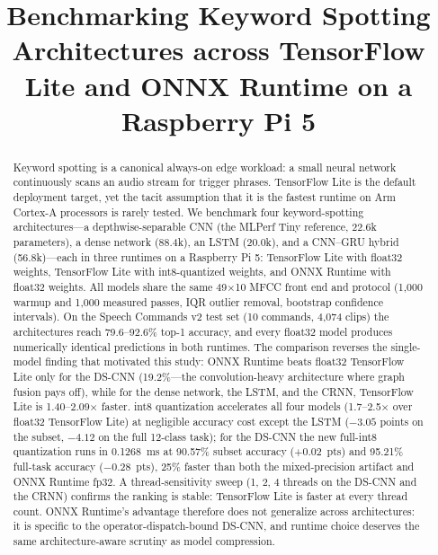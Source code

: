 \documentclass[conference,a4paper]{IEEEtran}
\begin{document}
\title{Benchmarking Keyword Spotting Architectures across TensorFlow Lite and ONNX Runtime on a Raspberry Pi 5}

\author{}

\maketitle

\begin{abstract}
Keyword spotting is a canonical always-on edge workload: a small neural network continuously scans an audio stream for trigger phrases. TensorFlow Lite is the default deployment target, yet the tacit assumption that it is the fastest runtime on Arm Cortex-A processors is rarely tested. We benchmark four keyword-spotting architectures---a depthwise-separable CNN (the MLPerf Tiny reference, 22.6k parameters), a dense network (88.4k), an LSTM (20.0k), and a CNN--GRU hybrid (56.8k)---each in three runtimes on a Raspberry Pi 5: TensorFlow Lite with float32 weights, TensorFlow Lite with int8-quantized weights, and ONNX Runtime with float32 weights. All models share the same 49$\times$10 MFCC front end and protocol (1{,}000 warmup and 1{,}000 measured passes, IQR outlier removal, bootstrap confidence intervals). On the Speech Commands v2 test set (10 commands, 4{,}074 clips) the architectures reach 79.6--92.6\% top-1 accuracy, and every float32 model produces numerically identical predictions in both runtimes. The comparison reverses the single-model finding that motivated this study: ONNX Runtime beats float32 TensorFlow Lite only for the DS-CNN (19.2\%---the convolution-heavy architecture where graph fusion pays off), while for the dense network, the LSTM, and the CRNN, TensorFlow Lite is 1.40--2.09$\times$ faster. int8 quantization accelerates all four models (1.7--2.5$\times$ over float32 TensorFlow Lite) at negligible accuracy cost except the LSTM ($-3.05$ points on the subset, $-4.12$ on the full 12-class task); for the DS-CNN the new full-int8 quantization runs in 0.1268~ms at 90.57\% subset accuracy ($+0.02$~pts) and 95.21\% full-task accuracy ($-0.28$~pts), 25\% faster than both the mixed-precision artifact and ONNX Runtime fp32. A thread-sensitivity sweep (1, 2, 4 threads on the DS-CNN and the CRNN) confirms the ranking is stable: TensorFlow Lite is faster at every thread count. ONNX Runtime's advantage therefore does not generalize across architectures: it is specific to the operator-dispatch-bound DS-CNN, and runtime choice deserves the same architecture-aware scrutiny as model compression.
\end{abstract}
\end{document}
